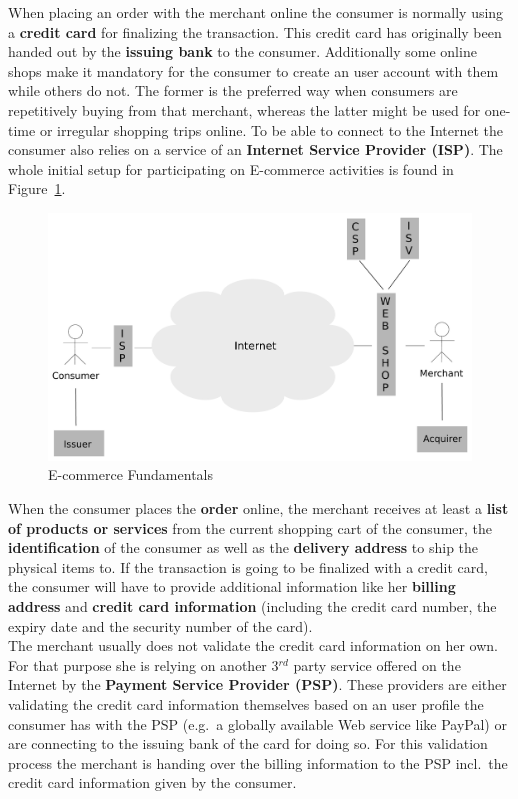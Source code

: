 When placing an order with the merchant online the consumer is normally using a \textbf{credit card} for finalizing the transaction. This credit card has originally been handed out by the \textbf{issuing bank} to the consumer. Additionally some online shops make it mandatory for the consumer to create an user account with them while others do not. The former is the preferred way when consumers are repetitively buying from that merchant, whereas the latter might be used for one-time or irregular shopping trips online. To be able to connect to the Internet the consumer also relies on a service of an \textbf{Internet Service Provider (\gls{ISP})}. The whole initial setup for participating on E-commerce activities is found in Figure~\ref{fig:images_ecommerce_scenario}.\@

\begin{figure}[H]
	\centering
		\includegraphics[width=0.8\columnwidth]{images/e-commerce-scenario.pdf}
	\caption{E-commerce Fundamentals}
\label{fig:images_ecommerce_scenario}
\end{figure}

When the consumer places the \textbf{order} online, the merchant receives at least a \textbf{list of products or services} from the current shopping cart of the consumer, the \textbf{identification} of the consumer as well as the \textbf{delivery address} to ship the physical items to. If the transaction is going to be finalized with a credit card, the consumer will have to provide additional information like her \textbf{billing address} and \textbf{credit card information} (including the credit card number, the expiry date and the security number of the card). \\

The merchant usually does not validate the credit card information on her own. For that purpose she is relying on another 3$^{rd}$ party service offered on the Internet by the \textbf{Payment Service Provider (\gls{PSP})}. These providers are either validating the credit card information themselves based on an user profile the consumer has with the \gls{PSP} (e.g.\ a globally available Web service like PayPal) or are connecting to the issuing bank of the card for doing so. For this validation process the merchant is handing over the billing information to the \gls{PSP} incl.\ the credit card information given by the consumer. \\

